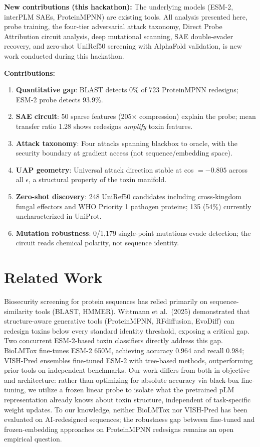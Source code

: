 \documentclass[11pt,a4paper]{article}
\begin{document}
\textbf{New contributions (this hackathon):} The underlying models (ESM-2, interPLM SAEs, ProteinMPNN) are existing tools. All analysis presented here, probe training, the four-tier adversarial attack taxonomy, Direct Probe Attribution circuit analysis, deep mutational scanning, SAE double-evader recovery, and zero-shot UniRef50 screening with AlphaFold validation, is new work conducted during this hackathon.

\textbf{Contributions:}
\begin{enumerate}
    \item \textbf{Quantitative gap}: BLAST detects 0\% of 723 ProteinMPNN redesigns; ESM-2 probe detects 93.9\%.
    \item \textbf{SAE circuit}: 50 sparse features (205$\times$ compression) explain the probe; mean transfer ratio 1.28 shows redesigns \textit{amplify} toxin features.
    \item \textbf{Attack taxonomy}: Four attacks spanning blackbox to oracle, with the security boundary at gradient access (not sequence/embedding space).
    \item \textbf{UAP geometry}: Universal attack direction stable at cos $= -0.805$ across all $\epsilon$, a structural property of the toxin manifold.
    \item \textbf{Zero-shot discovery}: 248 UniRef50 candidates including cross-kingdom fungal effectors and WHO Priority 1 pathogen proteins; 135 (54\%) currently uncharacterized in UniProt.
    \item \textbf{Mutation robustness}: 0/1,179 single-point mutations evade detection; the circuit reads chemical polarity, not sequence identity.
\end{enumerate}

\section{Related Work}

Biosecurity screening for protein sequences has relied primarily on sequence-similarity
tools (BLAST, HMMER). Wittmann et al.\ (2025) \cite{wittmann2025} demonstrated that
structure-aware generative tools (ProteinMPNN, RFdiffusion, EvoDiff) can redesign toxins
below every standard identity threshold, exposing a critical gap. Two concurrent ESM-2-based toxin classifiers directly address this gap. BioLMTox \cite{brixi2024biolmtox} fine-tunes ESM-2 650M, achieving accuracy 0.964 and recall 0.984; VISH-Pred \cite{vishwanath2024vishpred} ensembles fine-tuned ESM-2 with tree-based methods, outperforming prior tools on independent benchmarks. Our work differs from both in objective and architecture: rather than optimizing for absolute accuracy via black-box fine-tuning, we utilize a frozen linear probe to isolate what the pretrained pLM representation already knows about toxin structure, independent of task-specific weight updates. To our knowledge, neither BioLMTox nor VISH-Pred has been evaluated on AI-redesigned sequences; the robustness gap between fine-tuned and frozen-embedding approaches on ProteinMPNN redesigns remains an open empirical question.
\end{document}
